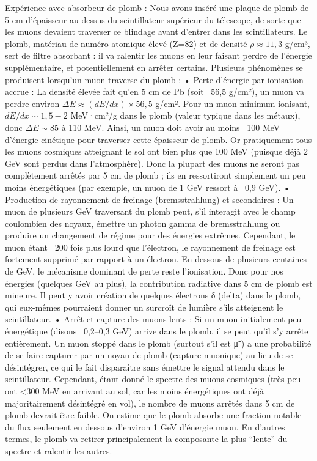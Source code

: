 \documentclass[a4paper,12pt,twoside]{article}
\begin{document}
Expérience avec absorbeur de plomb : Nous avons inséré une plaque de plomb de 5 cm d’épaisseur au-dessus du scintillateur supérieur du télescope, de sorte que les muons devaient traverser ce blindage avant d’entrer dans les scintillateurs. Le plomb, matériau de numéro atomique élevé (Z=82) et de densité $\rho \approx 11,3$ g/cm³, sert de filtre absorbant : il va ralentir les muons en leur faisant perdre de l’énergie supplémentaire, et potentiellement en arrêter certains. Plusieurs phénomènes se produisent lorsqu’un muon traverse du plomb :
	•	Perte d’énergie par ionisation accrue : La densité élevée fait qu’en 5 cm de Pb (soit ~56,5 g/cm²), un muon va perdre environ $\Delta E \approx (dE/dx) \times 56,5$ g/cm². Pour un muon minimum ionisant, $dE/dx \sim 1,5 - 2$ MeV·cm²/g dans le plomb (valeur typique dans les métaux), donc $\Delta E \sim 85$ à 110 MeV. Ainsi, un muon doit avoir au moins ~100 MeV d’énergie cinétique pour traverser cette épaisseur de plomb. Or pratiquement tous les muons cosmiques atteignant le sol ont bien plus que 100 MeV (puisque déjà 2 GeV sont perdus dans l’atmosphère). Donc la plupart des muons ne seront pas complètement arrêtés par 5 cm de plomb ; ils en ressortiront simplement un peu moins énergétiques (par exemple, un muon de 1 GeV ressort à ~0,9 GeV).
	•	Production de rayonnement de freinage (bremsstrahlung) et secondaires : Un muon de plusieurs GeV traversant du plomb peut, s’il interagit avec le champ coulombien des noyaux, émettre un photon gamma de bremsstrahlung ou produire un changement de régime pour des énergies extrêmes. Cependant, le muon étant ~200 fois plus lourd que l’électron, le rayonnement de freinage est fortement supprimé par rapport à un électron. En dessous de plusieurs centaines de GeV, le mécanisme dominant de perte reste l’ionisation. Donc pour nos énergies (quelques GeV au plus), la contribution radiative dans 5 cm de plomb est mineure. Il peut y avoir création de quelques électrons δ (delta) dans le plomb, qui eux-mêmes pourraient donner un surcroît de lumière s’ils atteignent le scintillateur.
	•	Arrêt et capture des muons lents : Si un muon initialement peu énergétique (disons ~0,2–0,3 GeV) arrive dans le plomb, il se peut qu’il s’y arrête entièrement. Un muon stoppé dans le plomb (surtout s’il est μ⁻) a une probabilité de se faire capturer par un noyau de plomb (capture muonique) au lieu de se désintégrer, ce qui le fait disparaître sans émettre le signal attendu dans le scintillateur. Cependant, étant donné le spectre des muons cosmiques (très peu ont <300 MeV en arrivant au sol, car les moins énergétiques ont déjà majoritairement désintégré en vol), le nombre de muons arrêtés dans 5 cm de plomb devrait être faible. On estime que le plomb absorbe une fraction notable du flux seulement en dessous d’environ 1 GeV d’énergie muon. En d’autres termes, le plomb va retirer principalement la composante la plus “lente” du spectre et ralentir les autres.
\end{document}
